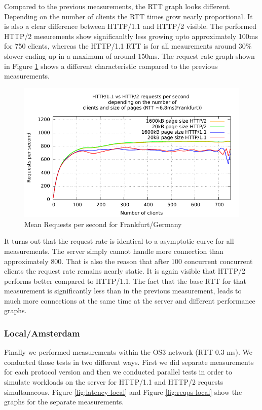 Compared to the previous measurements, the RTT graph looks different. Depending on the number of clients the RTT times grow nearly proportional. It is also a clear difference between HTTP/1.1 and HTTP/2 visible. The performed HTTP/2 mesurements show significanltly less growing upto approximately 100ms for 750 clients, whereas the HTTP/1.1 RTT is for all meaurements around 30\% slower ending up in a maximum of around 150ms. The  request rate graph shown in Figure \ref{fig:reqps-frankfurt} shows a different characteristic compared to the previous measurements.

\begin{figure}[H]
	\centering
	\includegraphics[scale=1,trim=0.0cm .0cm .0cm .0cm,clip]{images/reqps-frankfurt.pdf}
	\caption{Mean Requests per second for Frankfurt/Germany}
	\label{fig:reqps-frankfurt}
\end{figure}

It turns out that the request rate is identical to a asymptotic curve for all measurements. The server simply cannot handle more connection than approximately 800. That is also the reason that after 100 concurrent concurrent clients the request rate remains nearly static. It is again visible that HTTP/2 performs better compared to HTTP/1.1. The fact that the base RTT for that measurement is significantly less than in the previous measurement, leads to much more connections at the same time at the server and different performance graphs.

\subsubsection{Local/Amsterdam}

Finally we performed measurements within the OS3 network (RTT 0.3 ms). We conducted those tests in two different ways. First we did separate measurements for each protocol version and then we conducted parallel tests in order to simulate workloads on the server for HTTP/1.1 and HTTP/2 requests simultanaeous. Figure \ref{fig:latency-local} and Figure \ref{fig:reqps-local} show the graphs for the separate measurements.

